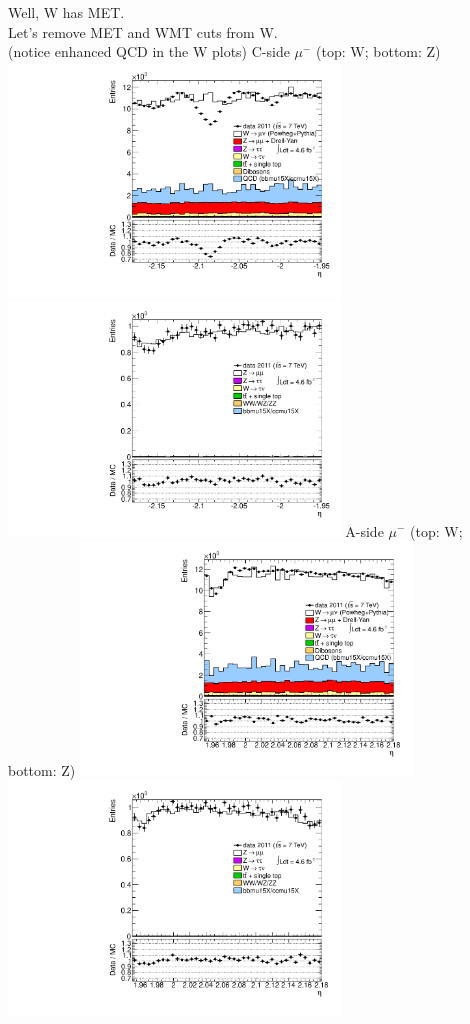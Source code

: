  {
Well, W has MET. \\
Let's remove MET and WMT cuts from W. \\
(notice enhanced QCD in the W plots)
}
 {
\colb[T]
C-side $\mu^{-}$ (top: W; bottom: Z)
\centering
\includegraphics[width=0.66\textwidth]{dates/20130306/figures/both/Wnometmt_10_C_stack_l_eta_NEG} \\
\includegraphics[width=0.66\textwidth]{dates/20130306/figures/both/Z_10_C_stack_lN_eta_ALL.pdf}
A-side $\mu^{-}$ (top: W; bottom: Z)
\centering
\includegraphics[width=0.66\textwidth]{dates/20130306/figures/both/Wnometmt_10_A_stack_l_eta_NEG} \\
\includegraphics[width=0.66\textwidth]{dates/20130306/figures/both/Z_10_A_stack_lN_eta_ALL.pdf} 
\cole
}

